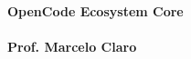 \begin{titlepage}
\pagecolor[HTML]{002B5B}
\color[HTML]{F4F6F9}
\begin{center}
\vspace*{3cm}
{\Huge \textbf{OpenCode Ecosystem Core}}\\[1cm]
{\Large }\\[3cm]
\vfill
{\Large \textbf{Prof. Marcelo Claro}}\\[1cm]
\end{center}
\end{titlepage}
\nopagecolor
